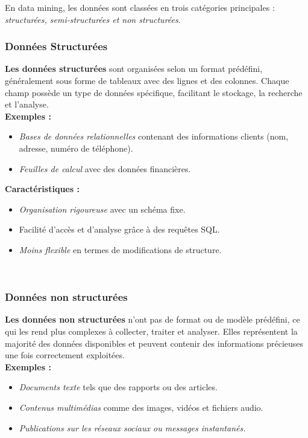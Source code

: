 \documentclass[a4paper,14pt]{article}
\begin{document}
        En data mining, les données sont classées en trois catégories principales : \textit{structurées, semi-structurées et non structurées}. \\

        \subsubsection{Données Structurées}
            \textbf{Les données structurées} sont organisées selon un format prédéfini, généralement sous forme de tableaux avec des lignes et des colonnes. Chaque champ possède un type de données spécifique, facilitant le stockage, la recherche et l'analyse.\\

            \textbf{Exemples :}
            \begin{itemize}
                \item \textit{Bases de données relationnelles} contenant des informations clients (nom, adresse, numéro de téléphone).
                \item \textit{Feuilles de calcul} avec des données financières.
            \end{itemize}
            
            \textbf{Caractéristiques :}
            \begin{itemize}
                \item \textit{Organisation rigoureuse} avec un schéma fixe.
                \item Facilité d'accès et d'analyse grâce à des requêtes SQL.
                \item \textit{Moins flexible} en termes de modifications de structure.
            \end{itemize}\\


        \subsubsection{Données non structurées}
            \textbf{Les données non structurées} n'ont pas de format ou de modèle prédéfini, ce qui les rend plus complexes à collecter, traiter et analyser. Elles représentent la majorité des données disponibles et peuvent contenir des informations précieuses une fois correctement exploitées.\\

            \textbf{Exemples :}
            \begin{itemize}
                \item \textit{Documents texte} tels que des rapports ou des articles.
                \item \textit{Contenus multimédias} comme des images, vidéos et fichiers audio.
                \item \textit{Publications sur les réseaux sociaux ou messages instantanés.}
            \end{itemize}
            
\end{document}
